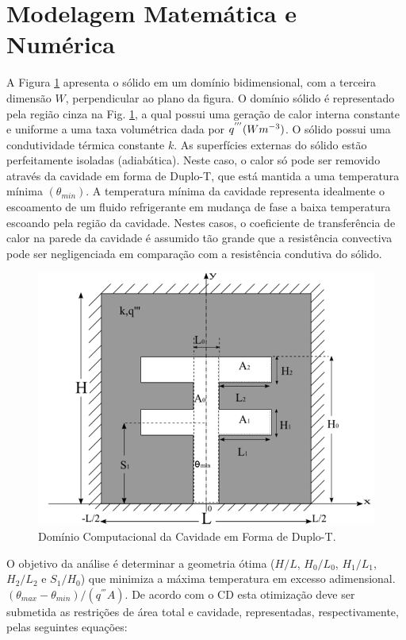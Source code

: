 \documentclass[12pt,A4,A4pt]{article}
\begin{document}
\section{Modelagem Matemática e Numérica}
\label{modelo}
\hspace{0.5cm}A Figura \ref{figure01} apresenta o sólido em um domínio bidimensional, com a terceira dimensão $W$, perpendicular ao plano da figura. O domínio sólido é representado pela região cinza na Fig. \ref{figure01}, a qual possui uma geração de calor interna constante e uniforme a uma taxa volumétrica dada por $q^{'''}(Wm^{\tiny -3})$. O sólido possui uma condutividade térmica constante $k$. As superfícies externas do sólido estão perfeitamente isoladas (adiabática). Neste caso, o calor só pode ser removido através da cavidade em forma de Duplo-T, que está mantida a uma temperatura mínima $(\theta_{min})$. A temperatura mínima da cavidade representa idealmente o escoamento de um fluido refrigerante em mudança de fase a baixa temperatura escoando pela região da cavidade. Nestes casos, o coeficiente de transferência de calor na parede da cavidade é assumido tão grande que a resistência convectiva pode ser negligenciada em comparação com a resistência condutiva do sólido.

\begin{figure}[h!]
\centering
\includegraphics[width=0.7\linewidth]{imgs/duplo_t.png}
\caption{ {\small Domínio Computacional da Cavidade em Forma de Duplo-T.}}
\label{figure01}
\end{figure}

O objetivo da análise é determinar a geometria ótima ($H/L$, $H_{0}/L_{0}$, $H_{1}/L_{1}$, $H_{2}/L_{2}$ e $S_{1}/H_{0}$) que minimiza a máxima temperatura em excesso adimensional. $(\theta_{max} - \theta_{min})/(q^{'''}A)$. De acordo com o CD esta otimização deve ser submetida as restrições de área total e cavidade, representadas, respectivamente, pelas seguintes equações:
\end{document}
